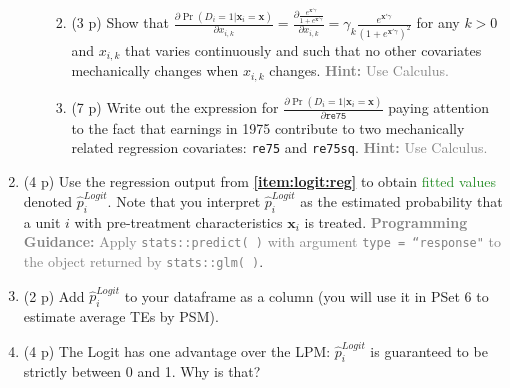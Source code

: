 \documentclass[
]{article}
\begin{document}
\begin{enumerate}
\begin{enumerate}
    \begin{enumerate}
    \def\labelenumiii{\roman{enumiii}.}
    \item
      (3 p) Show that
      \(\frac{\partial \Pr(D_i=1|\mathbf{x}_{i}=\mathbf{x})}{\partial x_{i,k}}=\frac{\partial \frac{e^{\mathbf{x}'\gamma}}{1+ e^{\mathbf{x}'\gamma}}}{\partial x_{i,k}}= \gamma_k \frac{e^{\mathbf{x}'\gamma}}{(1+e^{\mathbf{x}'\gamma})^2}\)
      for any \(k >0\) and \(x_{i,k}\) that varies continuously and such
      that no other covariates mechanically changes when \(x_{i,k}\)
      changes.
      \textcolor{gray}{\textbf{Hint:} Use Calculus.}\label{item:logit:partial}
    \item
      (7 p) Write out the expression for
      \(\frac{\partial \Pr(D_i=1|\mathbf{x}_{i}=\mathbf{x})}{\partial \texttt{re75}}\)
      paying attention to the fact that earnings in 1975 contribute to
      two mechanically related regression covariates: \texttt{re75} and
      \texttt{re75sq}.
      \textcolor{gray}{\textbf{Hint:} Use Calculus.}\label{item:logit:delta-pscore-re75}
    \end{enumerate}
  \end{enumerate}
\item
  (4 p) Use the regression output from \textbf{\ref{item:logit:reg}} to
  obtain \textcolor{ForestGreen}{fitted values} denoted
  \(\hat{p}_i^{Logit}\). Note that you interpret \(\hat{p}_i^{Logit}\)
  as the estimated probability that a unit \(i\) with pre-treatment
  characteristics \(\mathbf{x}_i\) is treated.
  \textcolor{gray}{\textbf{Programming Guidance:} Apply \texttt{stats::predict( )} with argument \texttt{type = ``response"} to the object returned by \texttt{stats::glm( )}}.\label{item:logit:fitted}
\item
  (2 p) Add \(\hat{p}_i^{Logit}\) to your dataframe as a column (you
  will use it in PSet 6 to estimate average TEs by PSM).
\item
  (4 p) The Logit has one advantage over the LPM: \(\hat{p}_i^{Logit}\)
  is guaranteed to be strictly between 0 and 1. Why is that?
\end{enumerate}
\end{document}
